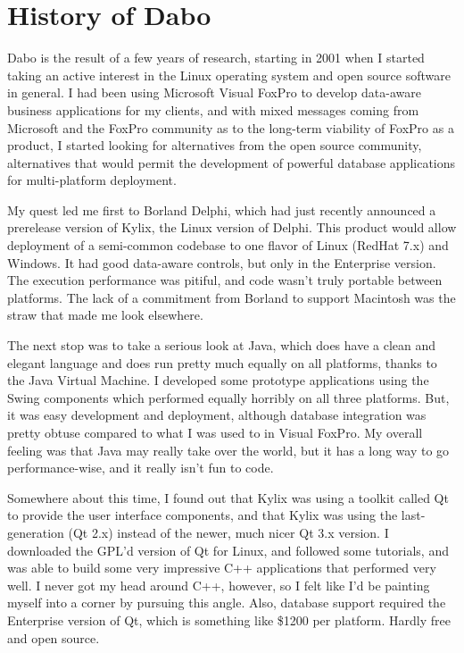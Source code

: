
\chapter{History of Dabo}

Dabo is the result of a few years of research, starting in 2001 when I started taking an active interest in the Linux operating system and open source software in general. I had been using Microsoft Visual FoxPro to develop data-aware business applications for my clients, and with mixed messages coming from Microsoft and the FoxPro community as to the long-term viability of FoxPro as a product, I started looking for alternatives from the open source community, alternatives that would permit the development of powerful database applications for multi-platform deployment.

My quest led me first to Borland Delphi, which had just recently announced a prerelease version of Kylix, the Linux version of Delphi. This product would allow deployment of a semi-common codebase to one flavor of Linux (RedHat 7.x) and Windows. It had good data-aware controls, but only in the Enterprise version. The execution performance was pitiful, and code wasn't truly portable between platforms. The lack of a commitment from Borland to support Macintosh was the straw that made me look elsewhere.

The next stop was to take a serious look at Java, which does have a clean and elegant language and does run pretty much equally on all platforms, thanks to the Java Virtual Machine. I developed some prototype applications using the Swing components which performed equally horribly on all three platforms. But, it was easy development and deployment, although database integration was pretty obtuse compared to what I was used to in Visual FoxPro. My overall feeling was that Java may really take over the world, but it has a long way to go performance-wise, and it really isn't fun to code.

Somewhere about this time, I found out that Kylix was using a toolkit called Qt to provide the user interface components, and that Kylix was using the last-generation (Qt 2.x) instead of the newer, much nicer Qt 3.x version. I downloaded the GPL'd version of Qt for Linux, and followed some tutorials, and was able to build some very impressive C++ applications that performed very well. I never got my head around C++, however, so I felt like I'd be painting myself into a corner by pursuing this angle. Also, database support required the Enterprise version of Qt, which is something like \$1200 per platform. Hardly free and open source.

